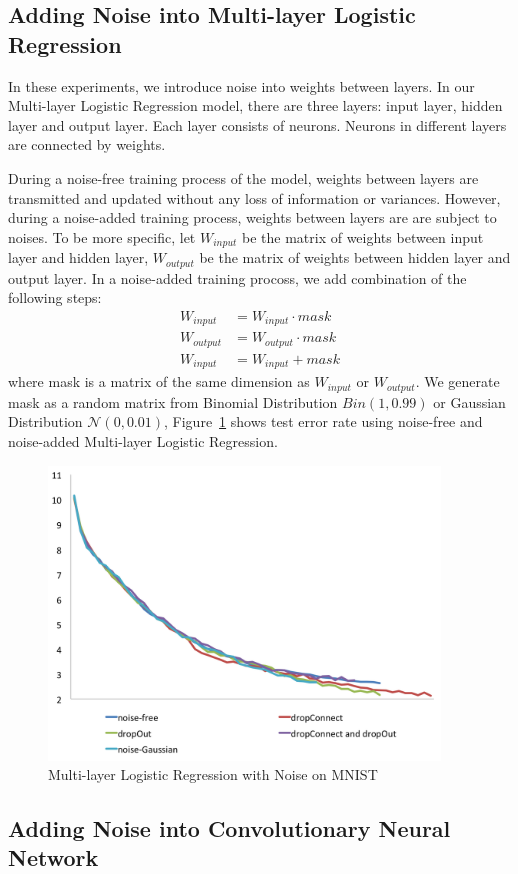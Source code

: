 \subsection{Adding Noise into Multi-layer Logistic Regression}
In these experiments, we introduce noise into weights between layers.
In our Multi-layer Logistic Regression model, there are three layers:
input layer, hidden layer and output layer. Each layer consists of
neurons. Neurons in different layers are connected by weights.

During a noise-free training process of the model, weights between layers
are transmitted and updated without any loss of information or variances.
However, during a noise-added training process, weights between layers are
are subject to noises.
To be more specific, let $W_{input}$ be the matrix of weights between
input layer and hidden layer, $W_{output}$ be the matrix of weights
between hidden layer and output layer. In a noise-added training procoss,
we add combination of the following steps:
\begin{align*}
W_{input} & = W_{input} \cdot mask \\
W_{output} & = W_{output} \cdot mask \\
W_{input} & = W_{input} + mask
\end{align*}
where mask is a matrix of the same dimension as $W_{input}$ or $W_{output}$.
We generate mask as a random matrix from Binomial Distribution
$Bin(1,0.99)$ or Gaussian Distribution $\mathcal{N}(0, 0.01)$,
Figure~\ref{mlp} shows test error rate using noise-free and noise-added
Multi-layer Logistic Regression.
\begin{figure}[!htbp]
\centering
\label{mlp}
\caption{Multi-layer Logistic Regression with Noise on MNIST}
\includegraphics[width=295pt]{f-figs/mlp.png}
\end{figure}

\subsection{Adding Noise into Convolutionary Neural Network}


